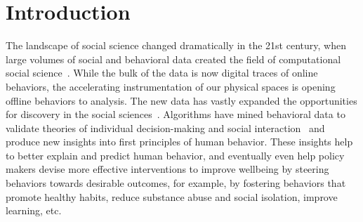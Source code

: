 \documentclass{svjour3}
\begin{document}
\section{Introduction}


The landscape of  social science  changed dramatically in the 21st century, when large volumes of social and behavioral data created the field of computational social science~\cite{Lazer09}. %
While the bulk  of the data is now digital traces of online behaviors, the accelerating instrumentation of our physical spaces %
is opening offline behaviors to analysis.
The new data has vastly expanded the opportunities for discovery in the social sciences~\cite{mcfarland2016sociology}.
Algorithms have mined behavioral data to validate theories of individual decision-making and social interaction~\cite{kleinberg2017human,bond201261} and produce new insights into first principles of human behavior. These insights help to better explain and predict human behavior, and eventually even help policy makers devise more effective interventions to improve wellbeing by steering behaviors towards desirable outcomes, for example, by fostering behaviors that promote healthy habits, reduce substance abuse and social isolation, improve learning, etc.
\end{document}
